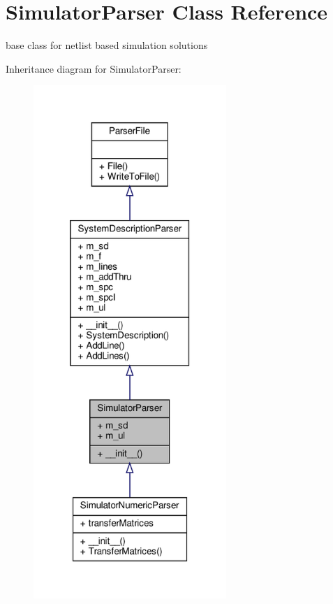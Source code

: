 \hypertarget{classSignalIntegrity_1_1Parsers_1_1SimulatorParser_1_1SimulatorParser}{}\section{Simulator\+Parser Class Reference}
\label{classSignalIntegrity_1_1Parsers_1_1SimulatorParser_1_1SimulatorParser}


base class for netlist based simulation solutions  




Inheritance diagram for Simulator\+Parser\+:
\nopagebreak
\begin{figure}[H]
\begin{center}
\leavevmode
\includegraphics[height=550pt]{classSignalIntegrity_1_1Parsers_1_1SimulatorParser_1_1SimulatorParser__inherit__graph}
\end{center}
\end{figure}


